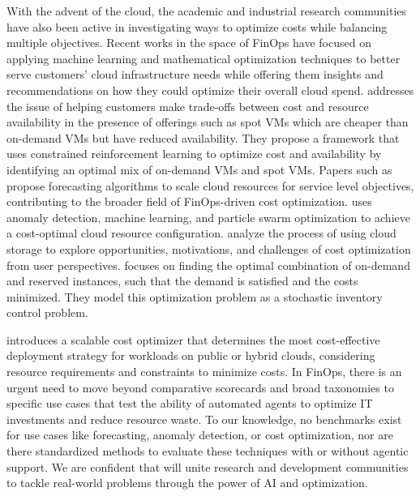 With the advent of the cloud, the academic and industrial research communities have also been active in investigating ways to optimize costs while balancing multiple objectives.
Recent works in the space of FinOps have focused on applying machine learning and mathematical optimization techniques \cite{containerfinops, OptITfinops} to better serve customers' cloud infrastructure needs while offering them insights and recommendations on how they could optimize their overall cloud spend. \cite{snapefinops} addresses the issue of helping customers make trade-offs between cost and resource availability in the presence of offerings such as spot VMs which are cheaper than on-demand VMs but have reduced availability. They propose a framework that uses constrained reinforcement learning to optimize cost and availability by identifying an optimal mix of on-demand VMs and spot VMs. %
Papers such as \cite{Resourcescalingfinops, forecastingfinops, autoscalingfinops} propose forecasting algorithms to scale cloud resources for service level objectives, contributing to the broader field of FinOps-driven cost optimization.
\cite{Resourcecostoptfinops} uses anomaly detection, machine learning, and particle swarm optimization to achieve a cost-optimal cloud resource configuration. \cite{Costoptfinops} analyze the process of using cloud storage to explore opportunities, motivations, and challenges of cost optimization from user perspectives. \cite{Inventoryfinops} focuses on finding the optimal combination of on-demand and reserved instances, such that the demand is satisfied and the costs minimized. They model this optimization problem as a stochastic inventory control problem. 

\cite{CCOfinops} introduces a scalable cost optimizer that determines the most cost-effective deployment strategy for workloads on public or hybrid clouds, considering resource requirements and constraints to minimize costs.
In FinOps, there is an urgent need to move beyond comparative scorecards and broad taxonomies to specific use cases that test the ability of automated agents to optimize IT investments and reduce resource waste. %
To our knowledge, no benchmarks exist for use cases like forecasting, anomaly detection, or cost optimization, nor are there standardized methods to evaluate these techniques with or without agentic support. We are confident that \bench will unite research and development communities to tackle real-world problems through the power of AI and optimization.
